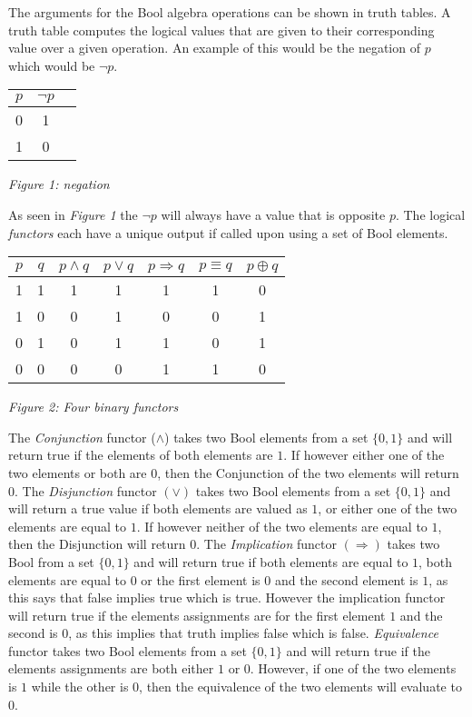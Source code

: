 \documentclass[11pt,a4paper]{article}
\begin{document}
The arguments for the Bool algebra operations can be shown in truth tables. A truth table computes the logical values that are given to their corresponding value over a given operation. An example of this would be the negation of $p$ which would be $\neg p$. 
\begin{center}
\begin{tabular}{|c|c|c|}
\hline
$p$ & $\neg p$\\ \hline
0 & 1 \\
1 & 0 \\ 
\hline
\end{tabular}  
\end{center}
\begin{center}
\emph{Figure 1: negation}
\end{center}
As seen in \emph{Figure 1} the $\neg p$ will always have a value that is opposite $p$.
The logical \emph{functors} each have a unique output if called upon using a set of Bool elements.
\begin{center}
\begin{tabular}{|c|c||c|c|c|c|c|}
\hline
$p$ & $q$ & $p \land q$ & $p \lor q$ & $p \Rightarrow q$ & $p \equiv q$ & $p \oplus q$		\\ \hline
1 & 1 & 1 & 1 & 1 & 1 & 0\\
1 & 0 & 0 & 1 & 0 & 0 & 1\\
0 & 1 & 0 & 1 & 1 & 0 & 1\\
0 & 0 & 0 & 0 & 1 & 1 & 0\\
\hline
\end{tabular}  
\end{center}
\begin{center}
\emph{Figure 2: Four binary functors}
\end{center}
The \emph{Conjunction} functor ($\land$) takes two Bool elements from a set $\{0,1\}$ and will return true if the elements of both elements are $1$. If however either one of the two elements or both are $0$, then the Conjunction of the two elements will return $0$. The \emph{Disjunction} functor $(\lor)$ takes two Bool elements from a set $\{0,1\}$ and will return a true value if both elements are valued as $1$, or either one of the two elements are equal to $1$. If however neither of the two elements are equal to $1$, then the Disjunction will return $0$. The \emph{Implication} functor $(\Rightarrow)$ takes two Bool from a set $\{0,1\}$ and will return true if both elements are equal to $1$, both elements are equal to $0$ or the first element is $0$ and the second element is $1$, as this says that false implies true which is true. However the implication functor will return true if the elements assignments are for the first element $1$ and the second is $0$, as this implies that truth implies false which is false. \emph{Equivalence} functor takes two Bool elements from a set $\{0,1\}$ and will return true if the elements assignments are both either $1$ or $0$. However, if one of the two elements is $1$ while the other is $0$, then the equivalence of the two elements will evaluate to $0$. 
\end{document}
